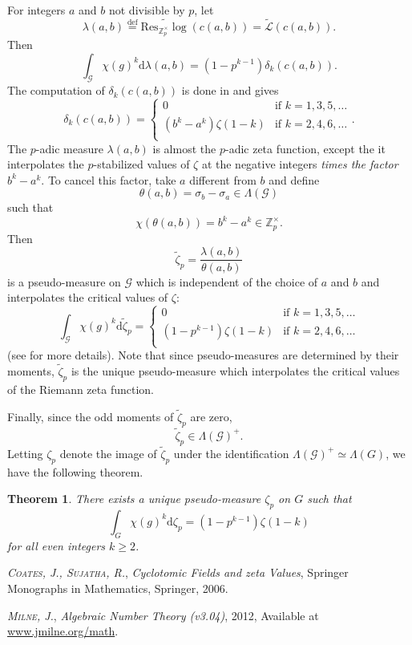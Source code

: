 \documentclass[twoside,10pt]{article}
\newtheorem{theorem}{Theorem}
\newcommand{\Z}{\mathbb{Z}}
\newcommand{\curlG}{\mathcal{G}}
\newcommand{\curlL}{\mathcal{L}}
\newcommand{\eqdef}{\overset{\text{def}}{=}}
\renewcommand{\d}{\text{d}}
\newcommand{\Res}{\text{Res}_{\Z_p^\times}}
\begin{document}
For integers $a$ and $b$ not divisible by $p$, let
\[\lambda(a,b)\eqdef\widetilde{\Res\log}(c(a,b))=\tilde{\curlL}(c(a,b)).\]
Then
\[\int_{\curlG}\chi(g)^k\d\lambda(a,b)=(1-p^{k-1})\delta_k(c(a,b)).\]
The computation of $\delta_k(c(a,b))$ is done in \cite[Proposition 2.6.3]{CS} and gives
\[
\delta_k(c(a,b))=\begin{cases}
	0	&\text{if }k=1,3,5,\dots\\
	(b^k-a^k)\zeta(1-k)&\text{if }k=2,4,6,\dots\\
\end{cases}.
\]
The $p$-adic measure $\lambda(a,b)$ is almost the $p$-adic zeta function, except the it interpolates the $p$-stabilized values of $\zeta$ at the negative integers \emph{times the factor }$b^k-a^k$. To cancel this factor, take $a$ different from $b$ and define
\[\theta(a,b)=\sigma_b-\sigma_a\in\Lambda(\curlG)\]
such that
\[\chi(\theta(a,b))=b^k-a^k\in\Z_p^\times.\]
Then
\[\tilde{\zeta}_p=\frac{\lambda(a,b)}{\theta(a,b)}\]
is a pseudo-measure on $\curlG$ which is independent of the choice of $a$ and $b$ and interpolates the critical values of $\zeta$:
\[
\int_{\curlG}\chi(g)^k\d\tilde{\zeta}_p=\begin{cases}
	0	&\text{if }k=1,3,5,\dots\\
	(1-p^{k-1})\zeta(1-k)&\text{if }k=2,4,6,\dots\\
\end{cases}
\]
(see \cite[Proposition 4.2.4]{CS} for more details). Note that since pseudo-measures are determined by their moments, $\tilde{\zeta}_p$ is the unique pseudo-measure which interpolates the critical values of the Riemann zeta function.

Finally, since the odd moments of $\tilde{\zeta}_p$ are zero,
\[\tilde{\zeta}_p\in\Lambda(\curlG)^+.\]
Letting $\zeta_p$ denote the image of $\tilde{\zeta}_p$ under the identification $\Lambda(\curlG)^+\simeq\Lambda(G)$, we have the following theorem.

\begin{theorem}
	There exists a unique pseudo-measure $\zeta_p$ on $G$ such that
	\[\int_G\chi(g)^k\d\zeta_p=(1-p^{k-1})\zeta(1-k)\]
	for all even integers $k\geq2$.
\end{theorem}

\begin{thebibliography}{DDDD}
    {\scshape\itshape Coates, J., Sujatha, R.}, \emph{Cyclotomic Fields and zeta Values}, Springer Monographs in Mathematics, Springer, 2006.
    
    {\scshape\itshape Milne, J.}, \emph{Algebraic Number Theory (v3.04)}, 2012, Available at \url{www.jmilne.org/math}.

\end{thebibliography}
\end{document}
